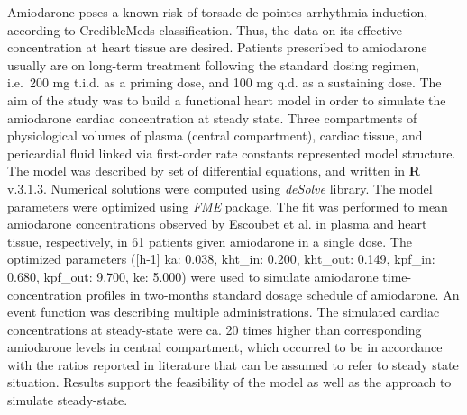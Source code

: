 \documentclass[\main/boa.tex]{subfiles}
\begin{document}
Amiodarone poses a known risk of torsade de pointes arrhythmia
induction, according to CredibleMeds classification. Thus, the data on
its effective concentration at heart tissue are desired. Patients
prescribed to amiodarone usually are on long-term treatment following
the standard dosing regimen, i.e.~200 mg t.i.d. as a priming dose, and
100 mg q.d. as a sustaining dose. The aim of the study was to build a
functional heart model in order to simulate the amiodarone cardiac
concentration at steady state. Three compartments of physiological
volumes of plasma (central compartment), cardiac tissue, and pericardial
fluid linked via first-order rate constants represented model structure.
The model was described by set of differential equations, and written in
\textbf{R} v.3.1.3. Numerical solutions were computed using
\emph{deSolve} library. The model parameters were optimized using
\emph{FME} package. The fit was performed to mean amiodarone
concentrations observed by Escoubet et al. in plasma and heart tissue,
respectively, in 61 patients given amiodarone in a single dose. The
optimized parameters ({[}h-1{]} ka: 0.038, kht\_in: 0.200, kht\_out:
0.149, kpf\_in: 0.680, kpf\_out: 9.700, ke: 5.000) were used to simulate
amiodarone time-concentration profiles in two-months standard dosage
schedule of amiodarone. An event function was describing multiple
administrations. The simulated cardiac concentrations at steady-state
were ca. 20 times higher than corresponding amiodarone levels in central
compartment, which occurred to be in accordance with the ratios reported
in literature that can be assumed to refer to steady state situation.
Results support the feasibility of the model as well as the approach to
simulate steady-state.
\end{document}
